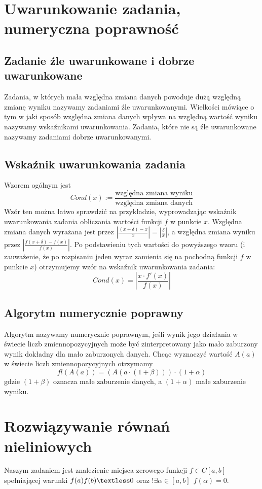 \documentclass[a4paper,11pt]{article}
\begin{document}
\clearpage
\section{Uwarunkowanie zadania, numeryczna poprawność}
\subsection{Zadanie źle uwarunkowane i dobrze uwarunkowane}
Zadania, w których mała względna zmiana danych powoduje dużą względną zmianę wyniku nazywamy zadaniami źle uwarunkowanymi. Wielkości mówiące o tym w jaki sposób względna zmiana danych wpływa na względną wartość wyniku nazywamy wskaźnikami uwarunkowania. Zadania, które nie są źle uwarunkowane nazywamy zadaniami dobrze uwarunkowanymi.

\subsection{Wskaźnik uwarunkowania zadania}
Wzorem ogólnym jest
$$Cond(x) := \frac{\text{względna zmiana wyniku}}{\text{względna zmiana danych}}$$
Wzór ten można łatwo sprawdzić na przykładzie, wyprowadzając wskaźnik uwarunkowania zadania obliczania wartości funkcji $f$ w punkcie $x$. Względna zmiana danych wyrażana jest przez $\left| \frac{(x+\delta)-x}{x}\right| = \left| \frac{\delta}{x} \right|$, a względna zmiana wyniku przez $\left| \frac{f(x+\delta)-f(x)}{f(x)}\right|$. Po podstawieniu tych wartości do powyższego wzoru (i zauważenie, że po rozpisaniu jeden wyraz zamienia się na pochodną funkcji $f$ w punkcie $x$) otrzymujemy wzór na wskaźnik uwarunkowania zadania:
$$ Cond(x) = \left| \frac{x\cdot f'(x)}{f(x)} \right|$$

\subsection{Algorytm numerycznie poprawny}
Algorytm nazywamy numerycznie poprawnym, jeśli wynik jego działania w świecie liczb zmiennopozycyjnych może być zinterpretowany jako mało zaburzony wynik dokładny dla mało zaburzonych danych. Chcąc wyznaczyć wartość $A(a)$ w świecie liczb zmiennopozycyjnych otrzymamy
$$fl(A(a)) = (A(a\cdot(1+\beta)))\cdot(1+\alpha)$$
gdzie $(1+\beta)$ oznacza małe zaburzenie danych, a $(1+\alpha)$ małe zaburzenie wyniku.


\clearpage
\section{Rozwiązywanie równań nieliniowych}
Naszym zadaniem jest znalezienie miejsca zerowego funkcji $f \in C[a,b]$ spełniającej warunki $f(a)f(b) \textless 0$ oraz $!\exists \alpha \in [a,b] \ \ f(\alpha)=0$.
\end{document}
